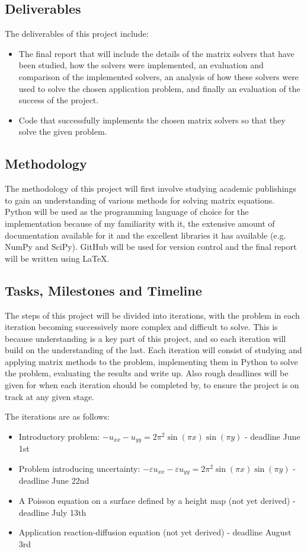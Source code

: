 \documentclass{article}
\numberwithin{equation}{section}
\begin{document}
\subsection{Deliverables}
The deliverables of this project include:
\begin{itemize}
\item The final report that will include the details of the matrix solvers that have been studied, how the solvers were implemented, an evaluation and comparison of the implemented solvers, an analysis of how these solvers were used to solve the chosen application problem, and finally an evaluation of the success of the project.  
\item Code that successfully implements the chosen matrix solvers so that they solve the given problem.
\end{itemize}

\subsection{Methodology}
The methodology of this project will first involve studying academic publishings to gain an understanding of various methods for solving matrix equations. Python will be used as the programming language of choice for the implementation because of my familiarity with it, the extensive amount of documentation available for it and the excellent libraries it has available (e.g. NumPy and SciPy). GitHub will be used for version control and the final report will be written using \LaTeX. 

\subsection{Tasks, Milestones and Timeline}
The steps of this project will be divided into iterations, with the problem in each iteration becoming successively more complex and difficult to solve. This is because understanding is a key part of this project, and so each iteration will build on the understanding of the last. Each iteration will consist of studying and applying matrix methods to the problem, implementing them in Python to solve the problem, evaluating the results and write up. Also rough deadlines will be given for when each iteration should be completed by, to ensure the project is on track at any given stage.

The iterations are as follows:
\begin{itemize}
\item Introductory problem: $-u_{xx} - u_{yy} = 2 \pi^2 \sin{(\pi x)} \sin{(\pi y)}$ - deadline June 1st
\item Problem introducing uncertainty: $-\varepsilon u_{xx} - \varepsilon u_{yy} = 2 \pi^2 \sin{(\pi x)} \sin{(\pi y)}$ - deadline June 22nd
\item A Poisson equation on a surface defined by a height map (not yet derived) - deadline July 13th
\item Application reaction-diffusion equation (not yet derived) - deadline August 3rd
\end{itemize}
\end{document}
